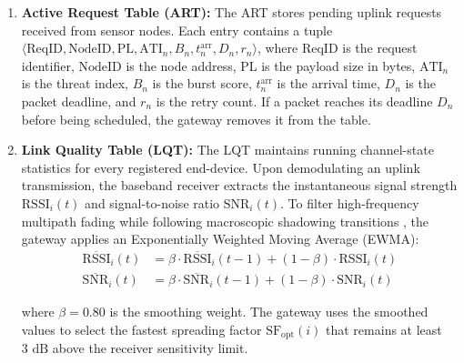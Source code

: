 \documentclass[preprint,review,12pt]{elsarticle}
\begin{document}
\begin{enumerate}

    \item \textbf{Active Request Table (ART):} The ART stores pending uplink requests received from sensor nodes. Each entry contains a tuple $\langle \text{ReqID}, \text{NodeID}, \text{PL}, \text{ATI}_n, B_n, t_n^{\text{arr}}, D_n, r_n \rangle$, where $\text{ReqID}$ is the request identifier, $\text{NodeID}$ is the node address, $\text{PL}$ is the payload size in bytes, $\text{ATI}_n$ is the threat index, $B_n$ is the burst score, $t_n^{\text{arr}}$ is the arrival time, $D_n$ is the packet deadline, and $r_n$ is the retry count. If a packet reaches its deadline $D_n$ before being scheduled, the gateway removes it from the table.

    \item \textbf{Link Quality Table (LQT):} The LQT maintains running channel-state statistics for every registered end-device. Upon demodulating an uplink transmission, the baseband receiver extracts the instantaneous signal strength $\text{RSSI}_i(t)$ and signal-to-noise ratio $\text{SNR}_i(t)$. To filter high-frequency multipath fading while following macroscopic shadowing transitions \cite{bor2016lora, adelantado2017understanding}, the gateway applies an Exponentially Weighted Moving Average (EWMA):
    \begin{align}
    \overline{\text{RSSI}}_i(t) &= \beta \cdot \overline{\text{RSSI}}_i(t-1) + (1-\beta) \cdot \text{RSSI}_i(t) \label{eq:ewma_rssi} \\
    \overline{\text{SNR}}_i(t) &= \beta \cdot \overline{\text{SNR}}_i(t-1) + (1-\beta) \cdot \text{SNR}_i(t) \label{eq:ewma_snr}
    \end{align}

    where $\beta = 0.80$ is the smoothing weight. The gateway uses the smoothed values to select the fastest spreading factor $\text{SF}_{\text{opt}}(i)$ that remains at least $3\text{ dB}$ above the receiver sensitivity limit.


\end{enumerate}
\end{document}
